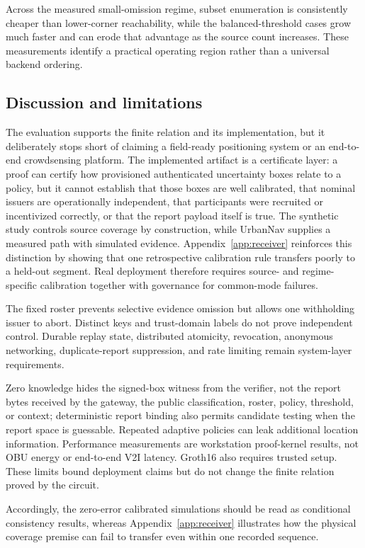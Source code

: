 \documentclass[preprint,review,12pt]{elsarticle}
\begin{document}
Across the measured small-omission regime, subset enumeration is consistently cheaper than lower-corner reachability, while the balanced-threshold cases grow much faster and can erode that advantage as the source count increases. These measurements identify a practical operating region rather than a universal backend ordering.

\subsection{Discussion and limitations}

The evaluation supports the finite relation and its implementation, but it deliberately stops short of claiming a field-ready positioning system or an end-to-end crowdsensing platform. The implemented artifact is a certificate layer: a proof can certify how provisioned authenticated uncertainty boxes relate to a policy, but it cannot establish that those boxes are well calibrated, that nominal issuers are operationally independent, that participants were recruited or incentivized correctly, or that the report payload itself is true. The synthetic study controls source coverage by construction, while UrbanNav supplies a measured path with simulated evidence. Appendix~\ref{app:receiver} reinforces this distinction by showing that one retrospective calibration rule transfers poorly to a held-out segment. Real deployment therefore requires source- and regime-specific calibration together with governance for common-mode failures.

The fixed roster prevents selective evidence omission but allows one withholding issuer to abort. Distinct keys and trust-domain labels do not prove independent control. Durable replay state, distributed atomicity, revocation, anonymous networking, duplicate-report suppression, and rate limiting remain system-layer requirements.

Zero knowledge hides the signed-box witness from the verifier, not the report bytes received by the gateway, the public classification, roster, policy, threshold, or context; deterministic report binding also permits candidate testing when the report space is guessable. Repeated adaptive policies can leak additional location information. Performance measurements are workstation proof-kernel results, not OBU energy or end-to-end V2I latency. Groth16 also requires trusted setup. These limits bound deployment claims but do not change the finite relation proved by the circuit.

Accordingly, the zero-error calibrated simulations should be read as conditional consistency results, whereas Appendix~\ref{app:receiver} illustrates how the physical coverage premise can fail to transfer even within one recorded sequence.
\end{document}
